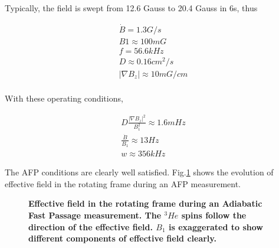 Typically, the field is swept from 12.6 Gauss to 20.4 Gauss in 6s, thus

\begin{subequations}
	\begin{gather}
	\dot B = 1.3G/s\\
	B1 \approx 100mG\\
	f = 56.6kHz\\
	D \approx 0.16cm^2/s\\
	|\nabla B_{z}| \approx 10mG/cm\\
	\end{gather}
\end{subequations}

With these operating conditions, 

\begin{subequations}
	\begin{gather}
	D\frac{|\nabla B_{z}|^{2}}{B_{1}^{2}} \approx 1.6mHz\\
	\frac{\dot B}{B_{1}} \approx 13Hz\\
	w \approx 356kHz
	\end{gather}
\end{subequations}

The AFP conditions are clearly well satisfied. Fig.\ref{AFP} shows the evolution of effective field in the rotating frame during an AFP measurement.

\begin{figure}[H]
	\centering
	\caption{{\bf Effective field in the rotating frame during an Adiabatic Fast Passage measurement. The $^{3}He$ spins follow the direction of the effective field. $B_{1}$ is exaggerated to show different components of effective field clearly.}}
	\label{AFP}
\end{figure}

